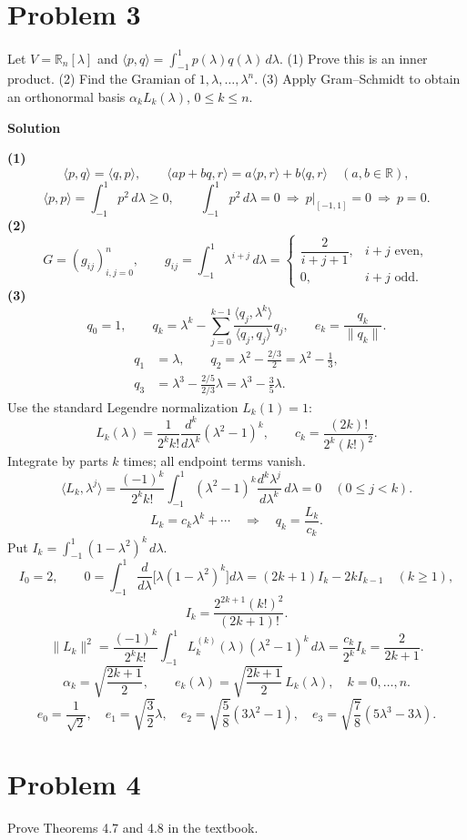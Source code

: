 \documentclass[UTF8,10pt,letterpaper,fontset=fandol]{ctexart}
\newcommand{\R}{\mathbb R}
\newcommand{\ip}[2]{\langle #1,#2\rangle}
\begin{document}
\section{Problem 3}
Let $V=\R_n[\lambda]$ and $\ip pq=\int_{-1}^1p(\lambda)q(\lambda)\,d\lambda$. (1) Prove this is an inner product. (2) Find the Gramian of $1,\lambda,\ldots,\lambda^n$. (3) Apply Gram--Schmidt to obtain an orthonormal basis $\alpha_kL_k(\lambda)$, $0\le k\le n$.
\par{}\textbf{Solution}\par
\textbf{(1)}
\[
 \ip pq=\ip qp,\qquad
 \ip{ap+bq}r=a\ip pr+b\ip qr\quad(a,b\in\R),
\]
\[
 \ip pp=\int_{-1}^1p^2\,d\lambda\ge0,\qquad
 \int_{-1}^1p^2\,d\lambda=0\ \Longrightarrow\ p|_{[-1,1]}=0\ \Longrightarrow\ p=0.
\]
\textbf{(2)}
\[
 \boxed{G=(g_{ij})_{i,j=0}^n,\qquad
 g_{ij}=\int_{-1}^1\lambda^{i+j}\,d\lambda
 =\begin{cases}\dfrac{2}{i+j+1},&i+j\text{ even},\\[3pt]0,&i+j\text{ odd} .\end{cases}}
\]
\textbf{(3)}
\[
 q_0=1,\qquad
 q_k=\lambda^k-\sum_{j=0}^{k-1}\frac{\ip{q_j}{\lambda^k}}{\ip{q_j}{q_j}}q_j,\qquad
 e_k=\frac{q_k}{\|q_k\|}.
\]
\begin{align*}
 q_1&=\lambda,\qquad
 q_2=\lambda^2-\frac{2/3}{2}=\lambda^2-\frac13,\\
 q_3&=\lambda^3-\frac{2/5}{2/3}\lambda=\lambda^3-\frac35\lambda.
\end{align*}
Use the standard Legendre normalization $L_k(1)=1$:
\[
 L_k(\lambda)=\frac{1}{2^kk!}\frac{d^k}{d\lambda^k}(\lambda^2-1)^k,
 \qquad c_k=\frac{(2k)!}{2^k(k!)^2}.
\]
Integrate by parts $k$ times; all endpoint terms vanish.
\[
 \ip{L_k}{\lambda^j}
 =\frac{(-1)^k}{2^kk!}\int_{-1}^1(\lambda^2-1)^k
 \frac{d^k\lambda^j}{d\lambda^k}\,d\lambda=0\quad(0\le j<k).
\]
\[
 L_k=c_k\lambda^k+\cdots
 \quad\Longrightarrow\quad q_k=\frac{L_k}{c_k}.
\]
Put $I_k=\int_{-1}^1(1-\lambda^2)^k\,d\lambda$.
\[
 I_0=2,\qquad
 0=\int_{-1}^1\frac{d}{d\lambda}\bigl[\lambda(1-\lambda^2)^k\bigr]d\lambda
 =(2k+1)I_k-2kI_{k-1}\quad(k\ge1),
\]
\[
 I_k=\frac{2^{2k+1}(k!)^2}{(2k+1)!}.\]
\[
 \|L_k\|^2=\frac{(-1)^k}{2^kk!}\int_{-1}^1L_k^{(k)}(\lambda)(\lambda^2-1)^k\,d\lambda=\frac{c_k}{2^k}I_k=\frac{2}{2k+1}.
\]
\[
 \boxed{\alpha_k=\sqrt{\frac{2k+1}{2}},\qquad
 e_k(\lambda)=\sqrt{\frac{2k+1}{2}}\,L_k(\lambda),\quad k=0,\ldots,n.}
\]
\[
 e_0=\frac1{\sqrt2},\quad e_1=\sqrt{\frac32}\lambda,\quad
 e_2=\sqrt{\frac58}(3\lambda^2-1),\quad
 e_3=\sqrt{\frac78}(5\lambda^3-3\lambda).
\]
\newpage
\section{Problem 4}
Prove Theorems 4.7 and 4.8 in the textbook.
\end{document}
